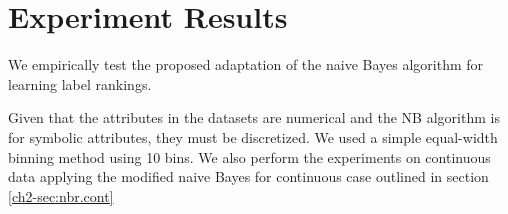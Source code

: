 %

\section{Experiment Results}
\label{ch2-sec:results}
We empirically test the proposed adaptation of the naive Bayes algorithm for learning label rankings.

%
%
Given that the attributes in the datasets are numerical and the NB algorithm is for symbolic attributes, they must be discretized. We used a simple equal-width binning method using 10 bins. We also perform the experiments on continuous data applying the modified naive Bayes for continuous case outlined in section \ref{ch2-sec:nbr.cont}


